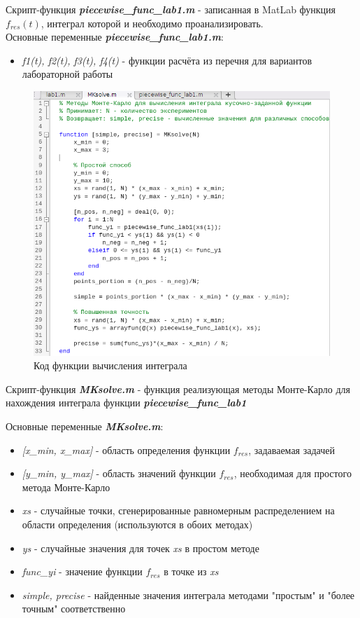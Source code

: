 \documentclass[12pt]{article}
\begin{document}
\newpage

Скрипт-функция \textbf{\textit{piecewise\_func\_lab1.m}} - записанная в MatLab функция $f_{res}(t)$, интеграл которой и необходимо проанализировать.\\

Основные переменные \textbf{\textit{piecewise\_func\_lab1.m}}:
\begin{itemize}
	\item \textit{f1(t), f2(t), f3(t), f4(t)} - функции расчёта из перечня для вариантов лабораторной работы
\end{itemize}

\newpage
 
\begin{figure}[!h]
	\centering
	\includegraphics[width=\linewidth]{MKsolve.png}
	\caption{Код функции вычисления интеграла}
\end{figure}

Скрипт-функция \textbf{\textit{MKsolve.m}} - функция реализующая методы Монте-Карло для нахождения интеграла функции \textbf{\textit{piecewise\_func\_lab1}}

Основные переменные \textbf{\textit{MKsolve.m}}:
\begin{itemize}
	\item \textit{[x\_min, x\_max]} - область определения функции $f_{res}$, задаваемая задачей
	\item \textit{[y\_min, y\_max]} - область значений функции $f_{res}$, необходимая для простого метода Монте-Карло
	\item \textit{xs} - случайные точки, сгенерированные равномерным распределением на области определения (используются в обоих методах)
	\item \textit{ys} - случайные значения для точек \textit{xs} в простом методе
	\item \textit{func\_yi} - значение функции $f_{res}$ в точке из \textit{xs}
	\item \textit{simple, precise} - найденные значения интеграла методами "простым" и "более точным" соответственно
\end{itemize}
\end{document}
